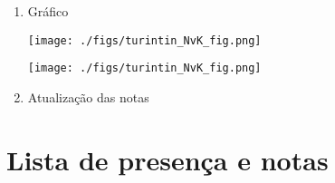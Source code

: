 \documentclass[11pt]{article}
\begin{document}
\begin{enumerate}
\item Gráfico
\label{sec:orgbcb0822}
\begin{center}
\texttt{[image: ./figs/turintin\_NvK\_fig.png]}
\end{center}
\begin{center}
\texttt{[image: ./figs/turintin\_NvK\_fig.png]}
\end{center}



\item Atualização das notas
\label{sec:org738e4d6}
\end{enumerate}

\section{Lista de presença e notas}
\label{sec:orge216533}
\end{document}
